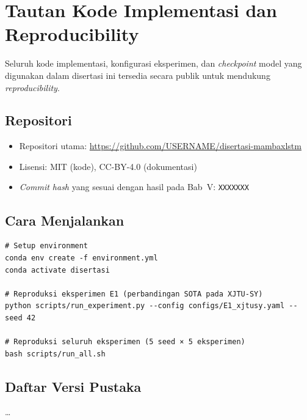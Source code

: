 
\chapter{Tautan Kode Implementasi dan Reproducibility}
\label{lamp:kode}

Seluruh kode implementasi, konfigurasi eksperimen, dan \emph{checkpoint}
model yang digunakan dalam disertasi ini tersedia secara publik untuk
mendukung \emph{reproducibility}.

\section{Repositori}
\label{lamp:kode_repo}

\begin{itemize}
  \item Repositori utama: \url{https://github.com/USERNAME/disertasi-mambaxlstm}
  \item Lisensi: MIT (kode), CC-BY-4.0 (dokumentasi)
  \item \emph{Commit hash} yang sesuai dengan hasil pada Bab~V:
        \texttt{XXXXXXX}
\end{itemize}

\section{Cara Menjalankan}
\label{lamp:kode_run}

\begin{verbatim}
# Setup environment
conda env create -f environment.yml
conda activate disertasi

# Reproduksi eksperimen E1 (perbandingan SOTA pada XJTU-SY)
python scripts/run_experiment.py --config configs/E1_xjtusy.yaml --seed 42

# Reproduksi seluruh eksperimen (5 seed × 5 eksperimen)
bash scripts/run_all.sh
\end{verbatim}

\section{Daftar Versi Pustaka}
\label{lamp:kode_versi}

\dots
